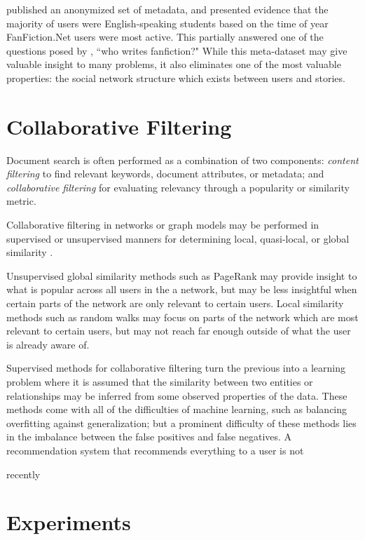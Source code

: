 \documentclass[letterpaper]{article}
\begin{document}
\cite{yin2017no} published an anonymized set of metadata, and presented evidence that the majority of users were English-speaking students based on the time of year FanFiction.Net users were most active.  This partially answered one of the questions posed by \cite{barnes2015fanfiction}, ``who writes fanfiction?"  While this meta-dataset may give valuable insight to many problems, it also eliminates one of the most valuable properties: the social network structure which exists between users and stories.

\section{Collaborative Filtering}

Document search is often performed as a combination of two components: \textit{content filtering} to find relevant keywords, document attributes, or metadata; and \textit{collaborative filtering} for evaluating relevancy through a popularity or similarity metric.

Collaborative filtering in networks or graph models may be performed in supervised or unsupervised manners for determining local, quasi-local, or global similarity \cite{nickel2016review,breese1998empirical}.

Unsupervised global similarity methods such as PageRank may provide insight to what is popular across all users in the a network, but may be less insightful when certain parts of the network are only relevant to certain users. Local similarity methods such as random walks may focus on parts of the network which are most relevant to certain users, but may not reach far enough outside of what the user is already aware of.

Supervised methods for collaborative filtering turn the previous into a learning problem where it is assumed that the similarity between two entities or relationships may be inferred from some observed properties of the data. These methods come with all of the difficulties of machine learning, such as balancing overfitting against generalization; but a prominent difficulty of these methods lies in the imbalance between the false positives and false negatives. A recommendation system that recommends everything to a user is not 

\cite{yang2017combining} recently

\section{Experiments}
\end{document}
